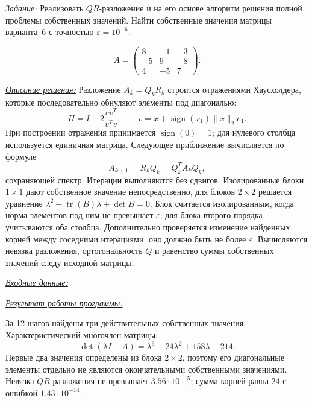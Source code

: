 \documentclass[a4paper,12pt]{article}
\newcommand{\labheading}[1]{\clearpage\noindent\hspace*{\parindent}{\fontsize{16}{19}\selectfont\bfseries Лабораторная работа № #1}\par\vspace{11pt}}
\newcommand{\task}[1]{\indent\textit{Задание:} #1\par}
\newcommand{\solution}[1]{\par\vspace{9pt}\indent\underline{\textit{Описание решения:}} #1}
\newcommand{\blocktitle}[1]{\par\Needspace{4\baselineskip}\vspace{9pt}\indent\underline{\textit{#1}}\par\vspace{4pt}}
\begin{document}
\labheading{1.5}
\task{Реализовать $QR$-разложение и на его основе алгоритм решения
полной проблемы собственных значений. Найти собственные значения
матрицы варианта~6 с точностью $\varepsilon=10^{-6}$.}
\[
A=\begin{pmatrix}8&-1&-3\\-5&9&-8\\4&-5&7\end{pmatrix}.
\]
\solution{}
Разложение $A_k=Q_kR_k$ строится отражениями Хаусхолдера,
которые последовательно обнуляют элементы под диагональю:
\[
H=I-2\frac{vv^T}{v^Tv},\qquad
v=x+\operatorname{sign}(x_1)\|x\|_2e_1.
\]
При построении отражения принимается $\operatorname{sign}(0)=1$;
для нулевого столбца используется единичная матрица.
Следующее приближение вычисляется по формуле
\[
A_{k+1}=R_kQ_k=Q_k^TA_kQ_k,
\]
сохраняющей спектр. Итерации выполняются без сдвигов.
Изолированные блоки $1\times1$ дают собственное значение
непосредственно, для блоков $2\times2$ решается уравнение
$\lambda^2-\operatorname{tr}(B)\lambda+\det B=0$.
Блок считается изолированным, когда норма элементов под ним
не превышает $\varepsilon$; для блока второго порядка учитываются
оба столбца. Дополнительно проверяется изменение найденных корней
между соседними итерациями: оно должно быть не более $\varepsilon$.
Вычисляются невязка разложения, ортогональность $Q$ и равенство
суммы собственных значений следу исходной матрицы.
\blocktitle{Входные данные:}
\blocktitle{Результат работы программы:}
За 12 шагов найдены три действительных собственных значения.
Характеристический многочлен матрицы:
\[
\det(\lambda I-A)=\lambda^3-24\lambda^2+158\lambda-214.
\]
Первые два значения определены из блока $2\times2$, поэтому
его диагональные элементы отдельно не являются окончательными
собственными значениями. Невязка $QR$-разложения не превышает
$3.56\cdot10^{-15}$; сумма корней равна $24$ с ошибкой
$1.43\cdot10^{-14}$.
\end{document}
